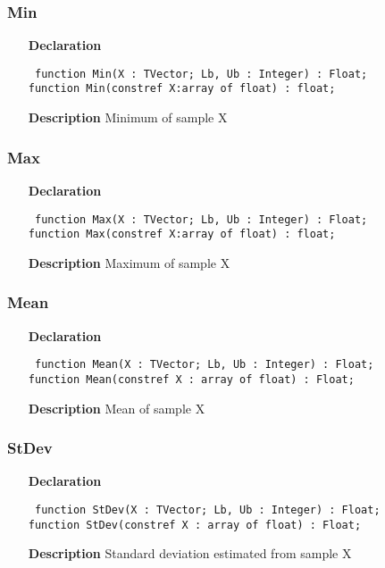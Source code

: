 \documentclass[12pt,a4paper,oneside]{report}
\newcommand{\declarationitem}[1]{\textbf{#1}}
\newcommand{\descriptiontitle}[1]{\textbf{#1}}
\newcommand{\code}[1]{\texttt{#1}}
\begin{document}
\subsubsection{Min}
\label{umeansd_md-Min}
\begin{itemize}\item[\declarationitem{Declaration}\hfill]
	\begin{flushleft}
		\code{
			function Min(X : TVector; Lb, Ub : Integer) : Float;}\\
		\code{function Min(constref X:array of float) : float;}
	\end{flushleft}
	\item[\descriptiontitle{Description}]
	Minimum of sample X
\end{itemize}
\subsubsection{Max}
\label{umeansd_md-Max}
\begin{itemize}\item[\declarationitem{Declaration}\hfill]
	\begin{flushleft}
		\code{
			function Max(X : TVector; Lb, Ub : Integer) : Float;}\\
		\code{function Max(constref X:array of float) : float;}
	\end{flushleft}
	\item[\descriptiontitle{Description}]
	Maximum of sample X
\end{itemize}
\subsubsection{Mean}
\label{umeansd_md-Mean}
\begin{itemize}\item[\declarationitem{Declaration}\hfill]
	\begin{flushleft}
		\code{
			function Mean(X : TVector; Lb, Ub : Integer) : Float;}\\
		\code{function Mean(constref X : array of float) : Float;}
	\end{flushleft}
	\item[\descriptiontitle{Description}]
	Mean of sample X
\end{itemize}
\subsubsection{StDev}
\label{umeansd_md-StDev}
\begin{itemize}\item[\declarationitem{Declaration}\hfill]
	\begin{flushleft}
		\code{
			function StDev(X : TVector; Lb, Ub : Integer) : Float;}\\
		\code{function StDev(constref X : array of float) : Float;}
	\end{flushleft}
	\item[\descriptiontitle{Description}]
	Standard deviation estimated from sample X
\end{itemize}
\end{document}
